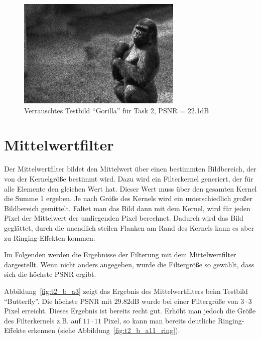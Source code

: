 \begin{figure}[htb]
 \centering
 \includegraphics[width=0.7\textwidth]{../images/noise_gorilla.jpg}
 \caption{Verrauschtes Testbild ``Gorilla'' für Task 2, PSNR = 22.1dB}
 \label{fig:t2_g}
\end{figure}

\clearpage



\section{Mittelwertfilter}

Der Mittelwertfilter bildet den Mittelwert über einen bestimmten Bildbereich, der von der Kernelgröße bestimmt wird. Dazu wird ein Filterkernel generiert, der für alle Elemente den gleichen Wert hat. Dieser Wert muss über den gesamten Kernel die Summe 1 ergeben. Je nach Größe des Kernels wird ein unterschiedlich großer Bildbereich gemittelt. Faltet man das Bild dann mit dem Kernel, wird für jeden Pixel der Mittelwert der umliegenden Pixel berechnet. Dadurch wird das Bild geglättet, durch die unendlich steilen Flanken am Rand des Kernels kann es aber zu Ringing-Effekten kommen.

\smallskip

Im Folgenden werden die Ergebnisse der Filterung mit dem Mittelwertfilter dargestellt. Wenn nicht anders angegeben, wurde die Filtergröße so gewählt, dass sich die höchste PSNR ergibt.

Abbildung~\ref{fig:t2_b_a3} zeigt das Ergebnis des Mittelwertfilters beim Testbild ``Butterfly''. Die höchste PSNR mit 29.82dB wurde bei einer Filtergröße von $3 \cdot 3$ Pixel erreicht. Dieses Ergebnis ist bereits recht gut. Erhöht man jedoch die Größe des Filterkernels z.B. auf $11 \cdot 11$ Pixel, so kann man bereits deutliche Ringing-Effekte erkennen (siehe Abbildung~\ref{fig:t2_b_a11_ring}).

